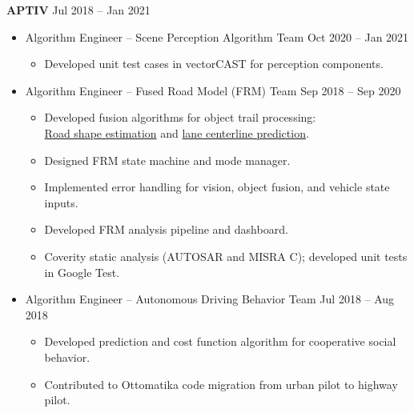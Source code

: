 \documentclass[a4paper,10pt,dvipdfmx]{article}
\def\CC{{C\nolinebreak[4]\hspace{-.05em}\raisebox{.4ex}{\tiny\bf ++}}}
\begin{document}
\textbf{APTIV} \hfill Jul 2018 -- Jan 2021
\begin{itemize}[noitemsep,nolistsep]
	\item[] Algorithm Engineer -- Scene Perception Algorithm Team \hfill Oct 2020 -- Jan 2021
    \begin{itemize}[noitemsep,nolistsep]
      \item Developed unit test cases in vectorCAST for perception components.
    \end{itemize}
  \item[] Algorithm Engineer -- Fused Road Model (FRM) Team \hfill Sep 2018 -- Sep 2020
    \begin{itemize}[noitemsep,nolistsep]
      \item Developed fusion algorithms for object trail processing:\\
        \href{https://youtu.be/nBhEnkIcLKs}{Road shape estimation} and \href{https://youtu.be/2v-jDRaczJs}{lane centerline prediction}.
      \item Designed FRM state machine and mode manager.
      \item Implemented error handling for vision, object fusion, and vehicle state inputs.
      \item Developed FRM analysis pipeline and dashboard.
      \item Coverity static analysis (AUTOSAR and MISRA \CC); developed unit tests in Google Test.
    \end{itemize}
  \item[] Algorithm Engineer -- Autonomous Driving Behavior Team \hfill Jul 2018 -- Aug 2018
    \begin{itemize}[noitemsep,nolistsep]
      \item Developed prediction and cost function algorithm for cooperative social behavior.
      \item Contributed to Ottomatika code migration from urban pilot to highway pilot.\\
    \end{itemize}
\end{itemize}
\end{document}
